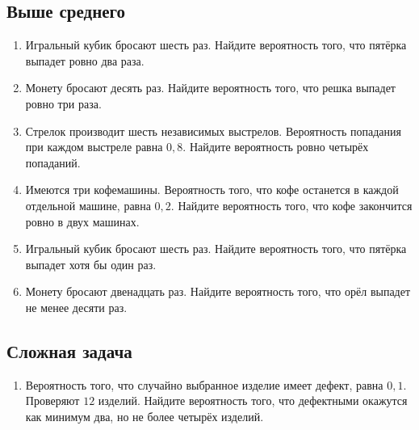 \documentclass[a4paper,12pt]{article}
\begin{document}
\subsection*{\color{darkaccent}Выше среднего}

\begin{enumerate}[label=\textbf{\arabic*.},resume]

    \item Игральный кубик бросают шесть раз. Найдите вероятность того, что пятёрка выпадет ровно два раза.

    \item Монету бросают десять раз. Найдите вероятность того, что решка выпадет ровно три раза.

    \item Стрелок производит шесть независимых выстрелов. Вероятность попадания при каждом выстреле равна $0{,}8$. Найдите вероятность ровно четырёх попаданий.

    \item Имеются три кофемашины. Вероятность того, что кофе останется в каждой отдельной машине, равна $0{,}2$. Найдите вероятность того, что кофе закончится ровно в двух машинах.

    \item Игральный кубик бросают шесть раз. Найдите вероятность того, что пятёрка выпадет хотя бы один раз.

    \item Монету бросают двенадцать раз. Найдите вероятность того, что орёл выпадет не менее десяти раз.

\end{enumerate}

\subsection*{\color{darkaccent}Сложная задача}

\begin{enumerate}[label=\textbf{\arabic*.},resume]

    \item Вероятность того, что случайно выбранное изделие имеет дефект, равна $0{,}1$. Проверяют $12$ изделий. Найдите вероятность того, что дефектными окажутся как минимум два, но не более четырёх изделий.

\end{enumerate}

\end{document}
